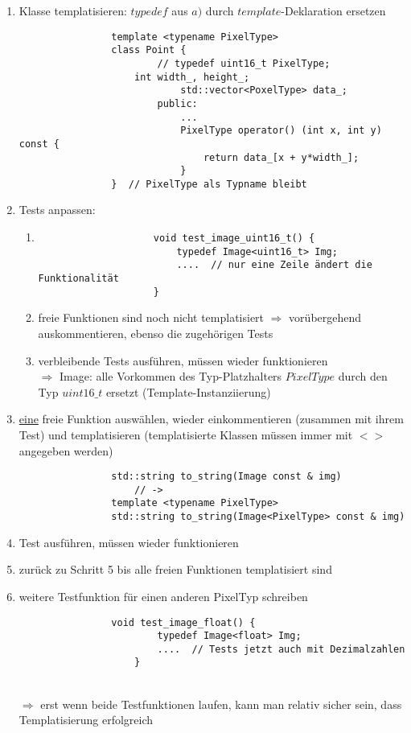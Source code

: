 \documentclass{article}
\begin{document}
\begin{itemize}
\begin{enumerate}
			\item Klasse templatisieren: $typedef$ aus $a)$ durch $template$-Deklaration ersetzen
			\begin{lstlisting}
				template <typename PixelType>
				class Point {
						// typedef uint16_t PixelType;
					int width_, height_;
							std::vector<PoxelType> data_;
						public:
							...
							PixelType operator() (int x, int y) const {
								return data_[x + y*width_];
							}
				}  // PixelType als Typname bleibt
			\end{lstlisting}
			\item Tests anpassen:
			\begin{enumerate}
				\item 
				\begin{lstlisting}
					void test_image_uint16_t() {
						typedef Image<uint16_t> Img;
						....  // nur eine Zeile ändert die Funktionalität
					}
				\end{lstlisting}
				\item freie Funktionen sind noch nicht templatisiert $\Rightarrow $ vorübergehend auskommentieren, ebenso die zugehörigen Tests
				\item verbleibende Tests ausführen, müssen wieder funktionieren  \\
				$\Rightarrow $ Image: alle Vorkommen des Typ-Platzhalters $PixelType$ durch den Typ $uint16\_t$ ersetzt (Template-Instanziierung)
			\end{enumerate}
			\item \underline{eine} freie Funktion auswählen, wieder einkommentieren (zusammen mit ihrem Test) und templatisieren (templatisierte Klassen müssen immer mit $<>$ angegeben werden)
			\begin{lstlisting}
				std::string to_string(Image const & img)
					// ->
				template <typename PixelType>
				std::string to_string(Image<PixelType> const & img)

			\end{lstlisting}
			\item Test ausführen, müssen wieder funktionieren
			\item zurück zu Schritt 5 bis alle freien Funktionen templatisiert sind
			\item weitere Testfunktion für einen anderen PixelTyp schreiben
			\begin{lstlisting}
				void test_image_float() {
						typedef Image<float> Img;
						....  // Tests jetzt auch mit Dezimalzahlen
					}
			\end{lstlisting}  \mbox{} \\
			$\Rightarrow $ erst wenn beide Testfunktionen laufen, kann man relativ sicher sein, dass Templatisierung erfolgreich
		\end{enumerate}
	\end{itemize}
\end{document}
